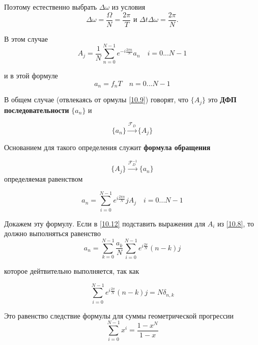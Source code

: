 Поэтому естественно выбрать $\Delta \omega$ из условия
\begin{equation}\label{10.7}
\Delta \omega = \frac{\Omega}{N} = \frac{2\pi}{T} \text{ и } \Delta t \Delta \omega = \frac{2\pi}{N}.
\end{equation}

В этом случае
\begin{equation}\label{10.8}
A_j = \frac{1}{N}\sum_{n = 0}^{N - 1} e^{-i \frac{2\pi n}{N}} a_n \quad i = 0 ... N - 1
\end{equation}

и в этой формуле
\begin{equation}\label{10.9}
a_n = f_n T \quad n = 0 ... N-1
\end{equation}

В общем случае (отвлекаясь от ормулы \ref{10.9}) говорят, что $\{A_j\}$ это \textbf{ДФП последовательности} $\{a_n\}$ и 

\begin{equation}\label{10.10}
\{a_n\} \xrightarrow{\mathscr{F}_D} \{A_j\}
\end{equation}

Основанием для такого определения служит \textbf{формула обращения}

\begin{equation}\label{10.11}
 \{A_j\}\xrightarrow{\mathscr{F}^{-1}_D} \{a_n\} 
\end{equation}
определяемая равенством

\begin{equation}\label{10.12}
a_n = \sum_{i = 0}^{N - 1} e^{i \frac{2\pi n}{N}} j A_j \quad i = 0 ... N - 1
\end{equation}

Докажем эту формулу. Если в \ref{10.12} подставить выражения для $A_i$ из \ref{10.8}, то должно выполняться равенство
\begin{equation}\label{10.13}
a_n = \sum_{k = 0}^{N - 1} \frac{a_k}{N} \sum_{i = 0}^{N - 1} e^{i \frac{2\pi }{N}}(n-k) j 
\end{equation}

которое дейтвительно выполняется, так как

\begin{equation}\label{10.14}
\sum_{i = 0}^{N - 1} e^{i \frac{2\pi }{N}}(n-k) j = N\delta_{n,k}
\end{equation}

Это равенство следствие формулы для суммы геометрической прогрессии
\begin{equation}\label{10.15}
\sum_{i = 0}^{N - 1} x^i = \frac{1-x^N}{1-x}
\end{equation}

